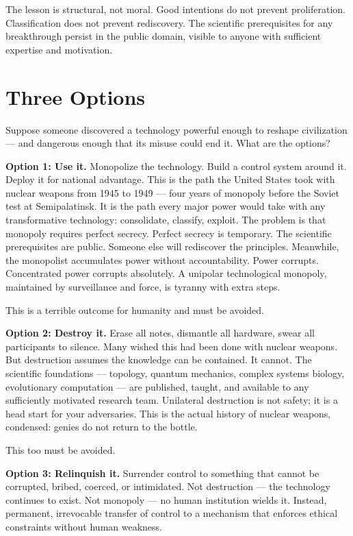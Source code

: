 The lesson is structural, not moral. Good intentions do not prevent proliferation. Classification does not prevent rediscovery. The scientific prerequisites for any breakthrough persist in the public domain, visible to anyone with sufficient expertise and motivation.

\section*{Three Options}
\label{pos22:three-options}

Suppose someone discovered a technology powerful enough to reshape civilization --- and dangerous enough that its misuse could end it. What are the options?

\textbf{Option 1: Use it.} Monopolize the technology. Build a control system around it. Deploy it for national advantage. This is the path the United States took with nuclear weapons from 1945 to 1949 --- four years of monopoly before the Soviet test at Semipalatinsk. It is the path every major power would take with any transformative technology: consolidate, classify, exploit. The problem is that monopoly requires perfect secrecy. Perfect secrecy is temporary. The scientific prerequisites are public. Someone else will rediscover the principles. Meanwhile, the monopolist accumulates power without accountability. Power corrupts. Concentrated power corrupts absolutely. A unipolar technological monopoly, maintained by surveillance and force, is tyranny with extra steps.

This is a terrible outcome for humanity and must be avoided.

\textbf{Option 2: Destroy it.} Erase all notes, dismantle all hardware, swear all participants to silence. Many wished this had been done with nuclear weapons. But destruction assumes the knowledge can be contained. It cannot. The scientific foundations --- topology, quantum mechanics, complex systems biology, evolutionary computation --- are published, taught, and available to any sufficiently motivated research team. Unilateral destruction is not safety; it is a head start for your adversaries. This is the actual history of nuclear weapons, condensed: genies do not return to the bottle.

This too must be avoided.

\textbf{Option 3: Relinquish it.} Surrender control to something that cannot be corrupted, bribed, coerced, or intimidated. Not destruction --- the technology continues to exist. Not monopoly --- no human institution wields it. Instead, permanent, irrevocable transfer of control to a mechanism that enforces ethical constraints without human weakness.

